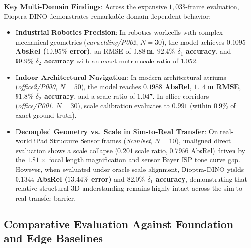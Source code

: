 \noindent\textbf{Key Multi-Domain Findings}: 
Across the expansive $1{,}038$-frame evaluation, Dioptra-DINO demonstrates remarkable domain-dependent behavior:
\begin{itemize}
    \item \textbf{Industrial Robotics Precision}: In robotics workcells with complex mechanical geometries (\textit{carwelding/P002}, $N=30$), the model achieves \textbf{$0.1095$ AbsRel ($10.95\%$ error)}, an RMSE of \textbf{$0.88$\,m}, \textbf{$92.4\%$ $\delta_1$ accuracy}, and \textbf{$99.9\%$ $\delta_2$ accuracy} with an exact metric scale ratio of \textbf{$1.052$}.
    \item \textbf{Indoor Architectural Navigation}: In modern architectural atriums (\textit{office2/P000}, $N=50$), the model reaches \textbf{$0.1988$ AbsRel}, \textbf{$1.14$\,m RMSE}, \textbf{$91.8\%$ $\delta_2$ accuracy}, and a scale ratio of \textbf{$1.047$}. In office corridors (\textit{office/P001}, $N=30$), scale calibration evaluates to \textbf{$0.991$} (within $0.9\%$ of exact ground truth).
    \item \textbf{Decoupled Geometry vs.\ Scale in Sim-to-Real Transfer}: On real-world iPad Structure Sensor frames (\textit{ScanNet}, $N=10$), unaligned direct evaluation shows a scale collapse ($0.201$ scale ratio, $0.7956$ AbsRel) driven by the $1.81\times$ focal length magnification and sensor Bayer ISP tone curve gap. However, when evaluated under oracle scale alignment, Dioptra-DINO yields \textbf{$0.1344$ AbsRel ($13.44\%$ error)} and \textbf{$82.0\%$ $\delta_1$ accuracy}, demonstrating that relative structural 3D understanding remains highly intact across the sim-to-real transfer barrier.
\end{itemize}


\subsection{Comparative Evaluation Against Foundation and Edge Baselines}
\label{sec:baseline_comparison}

